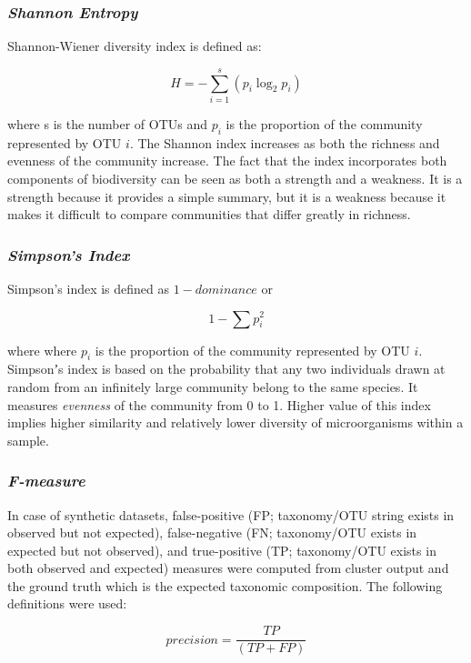 \documentclass[10pt, conference, compsocconf]{IEEEtran}
\begin{document}
\subsubsection{\textit{Shannon Entropy}}

Shannon-Wiener diversity index is defined as:

\begin{equation}
H={-} \sum_{i=1}^{s} \left( p_i\log_2p_i \right)
\end{equation}

where s is the number of OTUs and $p_i$ is the proportion of the community represented by OTU $i$. The Shannon index increases as both the richness and evenness of the community increase. The fact that the index incorporates both components of biodiversity can be seen as both a strength and a weakness. It is a strength because it provides a simple summary, but it is a weakness because it makes it difficult to compare communities that differ greatly in richness.


\subsubsection{\textit{Simpson's Index}}
Simpson’s index is defined as ${1-dominance}$ or

\begin{equation}
1 - \sum p_i^2
\end{equation}

where where $p_i$ is the proportion of the community represented by OTU $i$. Simpsonʼs index is based on the probability that any two individuals drawn at random from an infinitely large community belong to the same species. It measures \textit{evenness} of the community from 0 to 1. Higher value of this index implies higher similarity and relatively lower diversity of microorganisms within a sample.


\subsubsection{\textit{F-measure}}
In case of synthetic datasets, false-positive (FP; taxonomy/OTU string 
exists in observed but not expected), false-negative
(FN; taxonomy/OTU exists in expected but not observed), and 
true-positive (TP; taxonomy/OTU exists in both observed and expected) measures were computed from 
cluster output and the ground truth which is the expected taxonomic composition. The following definitions were used:

\begin{equation}
precision = \frac{TP}{(TP + FP)}
\end{equation}
\end{document}
